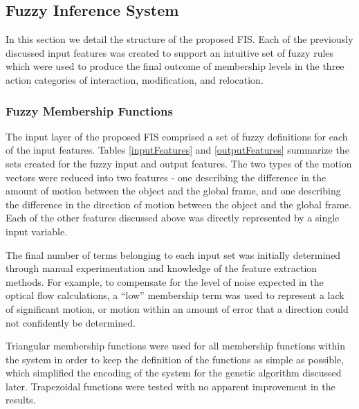 \documentclass[12pt]{report}
\begin{document}
\subsection{Fuzzy Inference System}
In this section we detail the structure of the proposed FIS. Each of the previously discussed input features was created to support an intuitive set of fuzzy rules which were used to produce the final outcome of membership levels in the three action categories of interaction, modification, and relocation.

\subsubsection{Fuzzy Membership Functions}
The input layer of the proposed FIS comprised a set of fuzzy definitions for each of the input features. Tables \ref{inputFeatures} and \ref{outputFeatures} summarize the sets created for the fuzzy input and output features. The two types of the motion vectors were reduced into two features - one describing the difference in the amount of motion between the object and the global frame, and one describing the difference in the direction of motion between the object and the global frame. Each of the other features discussed above was directly represented by a single input variable. 

The final number of terms belonging to each input set was initially determined through manual experimentation and knowledge of the feature extraction methods. For example, to compensate for the level of noise expected in the optical flow calculations, a ``low'' membership term was used to represent a lack of significant motion, or motion within an amount of error that a direction could not confidently be determined. 

Triangular membership functions were used for all membership functions within the system in order to keep the definition of the functions as simple as possible, which simplified the encoding of the system for the genetic algorithm discussed later. Trapezoidal functions were tested with no apparent improvement in the results.
\end{document}
